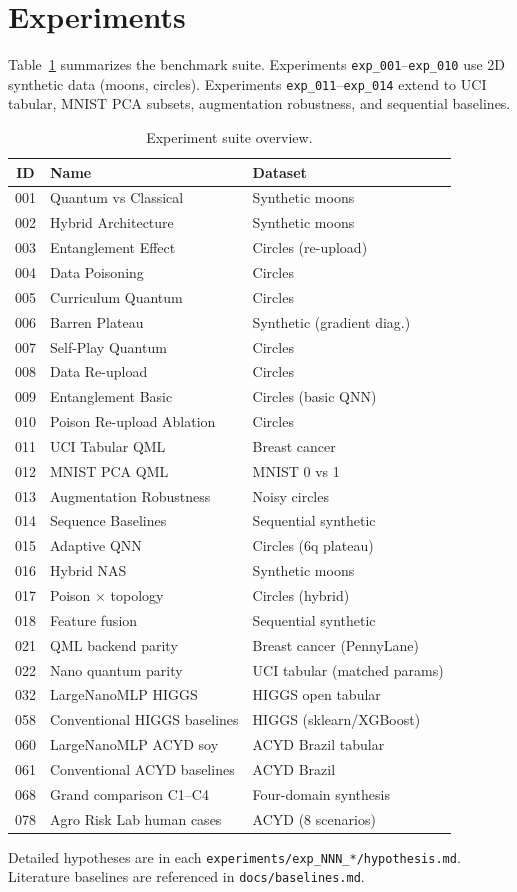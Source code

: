 \section{Experiments}
\label{sec:experiments}

Table~\ref{tab:experiments} summarizes the benchmark suite.
Experiments \texttt{exp\_001}--\texttt{exp\_010} use 2D synthetic data (moons, circles).
Experiments \texttt{exp\_011}--\texttt{exp\_014} extend to UCI tabular, MNIST PCA subsets,
augmentation robustness, and sequential baselines.

\begin{table}[ht]
\centering
\caption{Experiment suite overview.}
\label{tab:experiments}
\begin{tabular}{cll}
\toprule
ID & Name & Dataset \\
\midrule
001 & Quantum vs Classical & Synthetic moons \\
002 & Hybrid Architecture & Synthetic moons \\
003 & Entanglement Effect & Circles (re-upload) \\
004 & Data Poisoning & Circles \\
005 & Curriculum Quantum & Circles \\
006 & Barren Plateau & Synthetic (gradient diag.) \\
007 & Self-Play Quantum & Circles \\
008 & Data Re-upload & Circles \\
009 & Entanglement Basic & Circles (basic QNN) \\
010 & Poison Re-upload Ablation & Circles \\
011 & UCI Tabular QML & Breast cancer \\
012 & MNIST PCA QML & MNIST 0 vs 1 \\
013 & Augmentation Robustness & Noisy circles \\
014 & Sequence Baselines & Sequential synthetic \\
015 & Adaptive QNN & Circles (6q plateau) \\
016 & Hybrid NAS & Synthetic moons \\
017 & Poison $\times$ topology & Circles (hybrid) \\
018 & Feature fusion & Sequential synthetic \\
021 & QML backend parity & Breast cancer (PennyLane) \\
022 & Nano quantum parity & UCI tabular (matched params) \\
032 & LargeNanoMLP HIGGS & HIGGS open tabular \\
058 & Conventional HIGGS baselines & HIGGS (sklearn/XGBoost) \\
060 & LargeNanoMLP ACYD soy & ACYD Brazil tabular \\
061 & Conventional ACYD baselines & ACYD Brazil \\
068 & Grand comparison C1--C4 & Four-domain synthesis \\
078 & Agro Risk Lab human cases & ACYD (8 scenarios) \\
\bottomrule
\end{tabular}
\end{table}

Detailed hypotheses are in each \texttt{experiments/exp\_NNN\_*/hypothesis.md}.
Literature baselines are referenced in \texttt{docs/baselines.md}.
